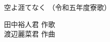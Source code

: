 \documentclass[10pt,b5j]{tarticle} %
\begin{document}
\begin{minipage}[c]{0.7\hsize} %
    \begin{center}
        {\LARGE
            空よ涯てなく %
        }
        {\small 
            （令和五年度寮歌） %
        }
    \end{center}
\end{minipage}
\begin{minipage}[c]{0.3\hsize} %
    \begin{flushright} %
        田中裕人君 作歌\\渡辺麗菜君 作曲 %
    \end{flushright}
\end{minipage}
\end{document}
